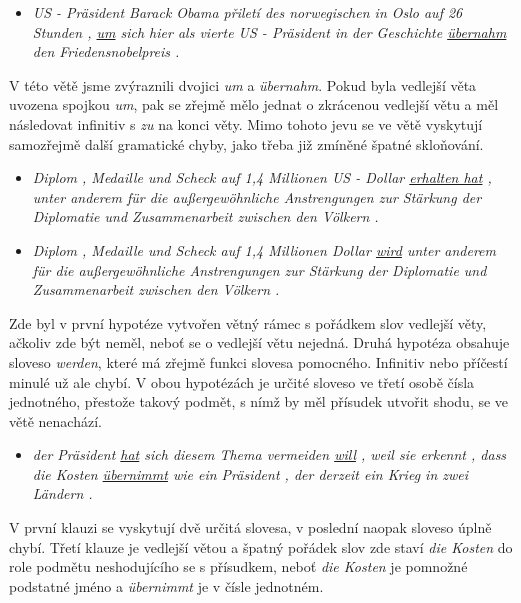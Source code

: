 \documentclass[12pt,a4paper]{report}
\begin{document}
\begin{itemize}
\item{\textit{US - Präsident Barack Obama přiletí des norwegischen in Oslo auf 26 Stunden , {\underline{\color{red}um}} sich hier als vierte US - Präsident in der Geschichte \underline{\color{red}übernahm} den Friedensnobelpreis .}}
\end{itemize}


V této větě jsme zvýraznili dvojici \textit{um} a \textit{übernahm}. Pokud byla vedlejší věta uvozena spojkou \textit{um}, pak se zřejmě mělo jednat o zkrácenou vedlejší větu a měl následovat infinitiv s \textit{zu} na konci věty. Mimo tohoto jevu se ve větě vyskytují samozřejmě další gramatické chyby, jako třeba již zmíněné špatné skloňování.

\begin{itemize}
\item{\textit{Diplom , Medaille und Scheck auf 1,4 Millionen US - Dollar \underline{\color{red}erhalten hat} , unter anderem für die außergewöhnliche Anstrengungen zur Stärkung der Diplomatie und Zusammenarbeit zwischen den Völkern .}}
\item{\textit{Diplom , Medaille und Scheck auf 1,4 Millionen Dollar \underline{\color{red}wird} unter anderem für die außergewöhnliche Anstrengungen zur Stärkung der Diplomatie und Zusammenarbeit zwischen den Völkern .}}
\end{itemize}

Zde byl v první hypotéze vytvořen větný rámec s pořádkem slov vedlejší věty, ačkoliv zde být neměl, neboť se o vedlejší větu nejedná. Druhá hypotéza obsahuje sloveso \textit{werden}, které má zřejmě funkci slovesa pomocného. Infinitiv nebo příčestí minulé už ale chybí. V obou hypotézách je určité sloveso ve třetí osobě čísla jednotného, přestože takový podmět, s nímž by měl přísudek utvořit shodu, se ve větě nenachází.

\begin{itemize}
\item{\textit{der Präsident \underline{\color{red}hat} sich diesem Thema vermeiden \underline{\color{red}will} , weil sie erkennt , dass die Kosten \underline{\color{red}übernimmt} wie ein Präsident , der derzeit ein Krieg in zwei Ländern .}}
\end{itemize}

V první klauzi se vyskytují dvě určitá slovesa, v poslední naopak sloveso úplně chybí. Třetí klauze je vedlejší větou a špatný pořádek slov zde staví \textit{die Kosten} do role podmětu neshodujícího se s přísudkem, neboť \textit{die Kosten} je pomnožné podstatné jméno a \textit{übernimmt} je v čísle jednotném.
\end{document}
